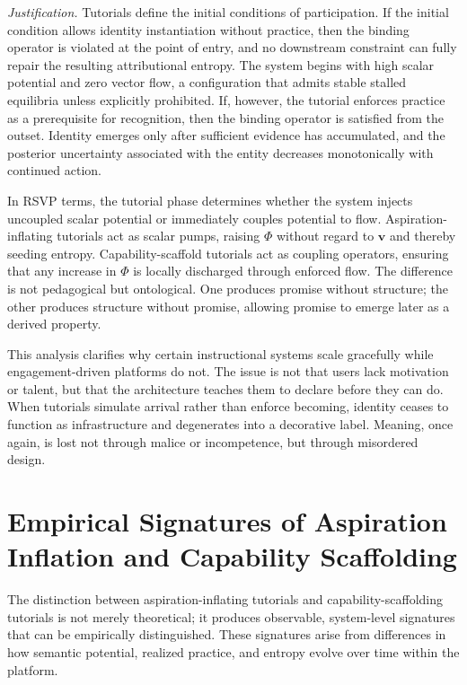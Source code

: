 \documentclass[11pt,oneside]{article}
\begin{document}
\textit{Justification.} Tutorials define the initial conditions of participation. If the initial condition allows identity instantiation without practice, then the binding operator is violated at the point of entry, and no downstream constraint can fully repair the resulting attributional entropy. The system begins with high scalar potential and zero vector flow, a configuration that admits stable stalled equilibria unless explicitly prohibited. If, however, the tutorial enforces practice as a prerequisite for recognition, then the binding operator is satisfied from the outset. Identity emerges only after sufficient evidence has accumulated, and the posterior uncertainty associated with the entity decreases monotonically with continued action.

In RSVP terms, the tutorial phase determines whether the system injects uncoupled scalar potential or immediately couples potential to flow. Aspiration-inflating tutorials act as scalar pumps, raising $\Phi$ without regard to $\mathbf{v}$ and thereby seeding entropy. Capability-scaffold tutorials act as coupling operators, ensuring that any increase in $\Phi$ is locally discharged through enforced flow. The difference is not pedagogical but ontological. One produces promise without structure; the other produces structure without promise, allowing promise to emerge later as a derived property.

This analysis clarifies why certain instructional systems scale gracefully while engagement-driven platforms do not. The issue is not that users lack motivation or talent, but that the architecture teaches them to declare before they can do. When tutorials simulate arrival rather than enforce becoming, identity ceases to function as infrastructure and degenerates into a decorative label. Meaning, once again, is lost not through malice or incompetence, but through misordered design.

\section{Empirical Signatures of Aspiration Inflation and Capability Scaffolding}

The distinction between aspiration-inflating tutorials and capability-scaffolding tutorials is not merely theoretical; it produces observable, system-level signatures that can be empirically distinguished. These signatures arise from differences in how semantic potential, realized practice, and entropy evolve over time within the platform.
\end{document}
